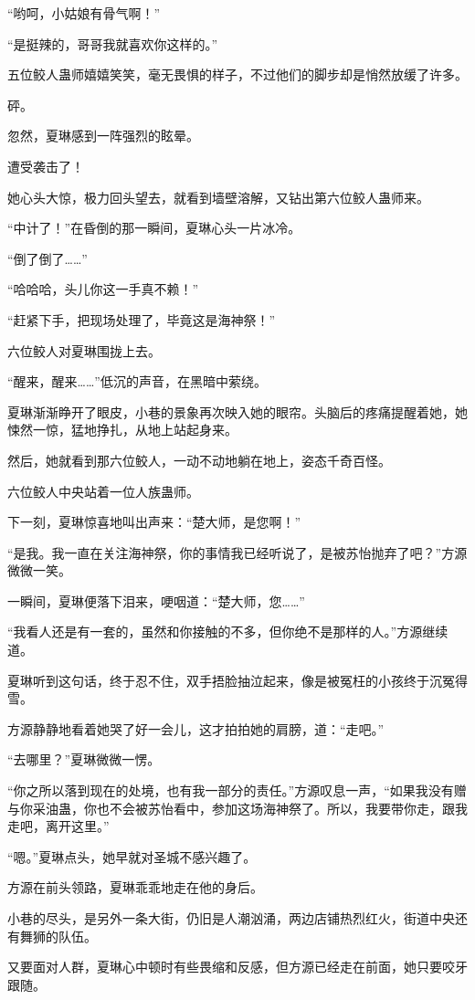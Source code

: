 \begin{this_body}
“哟呵，小姑娘有骨气啊！”

“是挺辣的，哥哥我就喜欢你这样的。”

五位鲛人蛊师嬉嬉笑笑，毫无畏惧的样子，不过他们的脚步却是悄然放缓了许多。

砰。

忽然，夏琳感到一阵强烈的眩晕。

遭受袭击了！

她心头大惊，极力回头望去，就看到墙壁溶解，又钻出第六位鲛人蛊师来。

“中计了！”在昏倒的那一瞬间，夏琳心头一片冰冷。

“倒了倒了……”

“哈哈哈，头儿你这一手真不赖！”

“赶紧下手，把现场处理了，毕竟这是海神祭！”

六位鲛人对夏琳围拢上去。

“醒来，醒来……”低沉的声音，在黑暗中萦绕。

夏琳渐渐睁开了眼皮，小巷的景象再次映入她的眼帘。头脑后的疼痛提醒着她，她悚然一惊，猛地挣扎，从地上站起身来。

然后，她就看到那六位鲛人，一动不动地躺在地上，姿态千奇百怪。

六位鲛人中央站着一位人族蛊师。

下一刻，夏琳惊喜地叫出声来：“楚大师，是您啊！”

“是我。我一直在关注海神祭，你的事情我已经听说了，是被苏怡抛弃了吧？”方源微微一笑。

一瞬间，夏琳便落下泪来，哽咽道：“楚大师，您……”

“我看人还是有一套的，虽然和你接触的不多，但你绝不是那样的人。”方源继续道。

夏琳听到这句话，终于忍不住，双手捂脸抽泣起来，像是被冤枉的小孩终于沉冤得雪。

方源静静地看着她哭了好一会儿，这才拍拍她的肩膀，道：“走吧。”

“去哪里？”夏琳微微一愣。

“你之所以落到现在的处境，也有我一部分的责任。”方源叹息一声，“如果我没有赠与你采油蛊，你也不会被苏怡看中，参加这场海神祭了。所以，我要带你走，跟我走吧，离开这里。”

“嗯。”夏琳点头，她早就对圣城不感兴趣了。

方源在前头领路，夏琳乖乖地走在他的身后。

小巷的尽头，是另外一条大街，仍旧是人潮汹涌，两边店铺热烈红火，街道中央还有舞狮的队伍。

又要面对人群，夏琳心中顿时有些畏缩和反感，但方源已经走在前面，她只要咬牙跟随。


\end{this_body}
